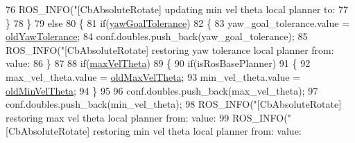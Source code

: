 \begin{DoxyCode}
{{76             ROS\_INFO(\textcolor{stringliteral}{"[CbAbsoluteRotate] updating min vel theta local planner to: %
77        \}
78     \}
79     \textcolor{keywordflow}{else}
80     \{
81         \textcolor{keywordflow}{if}(\hyperlink{classcl__move__base__z_1_1CbAbsoluteRotate_a8d8b5b9c2c821efe101bb07c96c4bdd3}{yawGoalTolerance})
82         \{
83             yaw\_goal\_tolerance.value = \hyperlink{classcl__move__base__z_1_1CbAbsoluteRotate_a2cfcd2978e7923494e2e66107e134e27}{oldYawTolerance};
84             conf.doubles.push\_back(yaw\_goal\_tolerance);
85             ROS\_INFO(\textcolor{stringliteral}{"[CbAbsoluteRotate] restoring yaw tolerance local planner from: %
       value: %
86         \}
87 
88         \textcolor{keywordflow}{if}(\hyperlink{classcl__move__base__z_1_1CbAbsoluteRotate_ac0018b01a202dd805e3d3b50ed205d23}{maxVelTheta})
89         \{
90             \textcolor{keywordflow}{if}(isRosBasePlanner)
91             \{
92                 max\_vel\_theta.value = \hyperlink{classcl__move__base__z_1_1CbAbsoluteRotate_a131095d57ad3fd423bb9eaebebf61cc9}{oldMaxVelTheta};
93                 min\_vel\_theta.value = \hyperlink{classcl__move__base__z_1_1CbAbsoluteRotate_a280721d1887e622330ee3ac44b7e84d5}{oldMinVelTheta};
94             \}
95 
96             conf.doubles.push\_back(max\_vel\_theta);
97             conf.doubles.push\_back(min\_vel\_theta);
98             ROS\_INFO(\textcolor{stringliteral}{"[CbAbsoluteRotate] restoring max vel theta local planner from: %
       value: %
99             ROS\_INFO(\textcolor{stringliteral}{"[CbAbsoluteRotate] restoring min vel theta local planner from: %
       value: %
}}}}}}
\end{DoxyCode}
